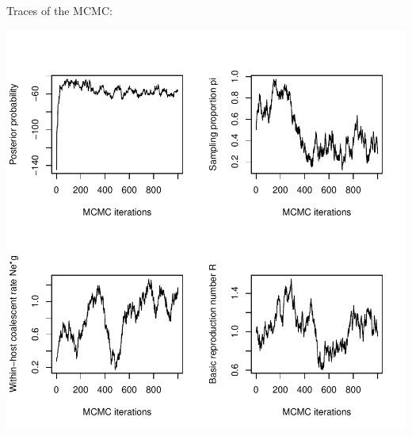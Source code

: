 \documentclass[a4paper]{article}
\begin{document}
Traces of the MCMC:

\includegraphics{epiphylo-009}
\end{document}
